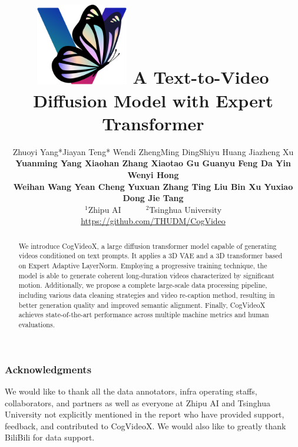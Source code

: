 \documentclass{article} %
\title{
\includegraphics[width=0.3\textwidth]{images/logo.png}
A Text-to-Video Diffusion Model with Expert Transformer}
\author{Zhuoyi Yang*\aspace Jiayan Teng* \aspace Wendi Zheng\aspace Ming Ding\aspace Shiyu Huang \aspace Jiazheng Xu \aspace \\
\textbf{Yuanming Yang \aspace Xiaohan Zhang \aspace Xiaotao Gu 
\aspace Guanyu Feng \aspace  Da Yin \aspace Wenyi Hong \aspace } \\
\textbf{ Weihan Wang \aspace Yean Cheng \aspace Yuxuan Zhang \aspace Ting Liu \aspace Bin Xu \aspace Yuxiao Dong \aspace Jie Tang} \\
$^1$Zhipu AI\ \ \ \ \ \ $^2$Tsinghua University \\
\href{https://github.com/THUDM/CogVideo}{https://github.com/THUDM/CogVideo}
}
\newcommand{\hide}[1]{}
\newcommand{\model}{CogVideoX\xspace}
\begin{document}
\maketitle

\renewcommand{\thefootnote}{}
\renewcommand{\thefootnote}{\arabic{footnote}}
\begin{abstract}
We introduce CogVideoX, a large diffusion transformer model capable of generating videos conditioned on text prompts. It applies a 3D VAE and a 3D transformer based on Expert Adaptive LayerNorm. Employing a progressive training technique, the model is able to generate coherent long-duration videos characterized by significant motion. Additionally, we propose a complete large-scale data processing pipeline, including various data cleaning strategies and video re-caption method, resulting in better generation quality and improved semantic alignment. Finally, CogVideoX achieves state-of-the-art performance across multiple machine metrics and human evaluations.
\end{abstract}









 
\subsubsection*{Acknowledgments}

We would like to thank all the data annotators, infra operating staffs, collaborators, and partners as well as everyone at Zhipu AI and Tsinghua University not explicitly mentioned in the report who have provided support, feedback, and contributed to \model. 
We would also like to greatly thank BiliBili for data support. 






\hide{ %

\clearpage
\appendix






}%
\end{document}

